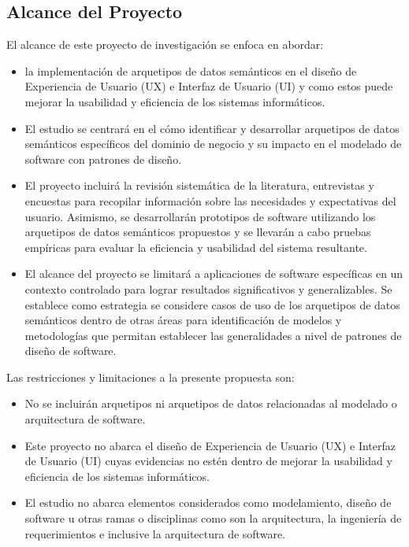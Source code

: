 \documentclass[12pt,a4paper]{article}
\begin{document}
\subsection{Alcance del Proyecto}
\label{sec:6}
El alcance de este proyecto de investigación se enfoca en abordar:
\begin{itemize}
  \item 
   la implementación de arquetipos de datos semánticos en el diseño de Experiencia de Usuario (UX) e Interfaz de Usuario (UI) y como estos puede mejorar la usabilidad y eficiencia de los sistemas informáticos. 
  \item 
  El estudio se centrará en el cómo identificar y desarrollar arquetipos de datos semánticos específicos del dominio de negocio y su impacto en el modelado de software con patrones de diseño. 
  \item 
  El proyecto incluirá la revisión sistemática de la literatura, entrevistas y encuestas para recopilar información sobre las necesidades y expectativas del usuario. Asimismo, se desarrollarán prototipos de software utilizando los arquetipos de datos semánticos propuestos y se llevarán a cabo pruebas empíricas para evaluar la eficiencia y usabilidad del sistema resultante. 
  \item 
  El alcance del proyecto se limitará a aplicaciones de software específicas en un contexto controlado para lograr resultados significativos y generalizables. Se establece como estrategia se considere casos de uso de los arquetipos de datos semánticos dentro de otras áreas para identificación de modelos y metodologías que permitan establecer las generalidades a nivel de patrones de diseño de software.
\end{itemize}
Las restricciones y limitaciones a la presente propuesta son:
\begin{itemize}
  \item 
  No se incluirán arquetipos ni arquetipos de datos relacionadas al modelado o arquitectura de software.
  \item 
  Este proyecto no abarca el diseño de Experiencia de Usuario (UX) e Interfaz de Usuario (UI) cuyas evidencias no estén dentro de mejorar la usabilidad y eficiencia de los sistemas informáticos.
  \item 
  El estudio no abarca elementos considerados como modelamiento, diseño de software u otras ramas o disciplinas como son la arquitectura, la ingeniería de requerimientos e inclusive la arquitectura de software.
\end{itemize}
\end{document}
